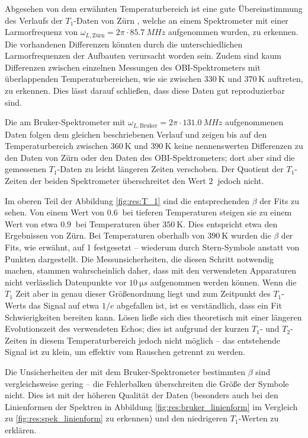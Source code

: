Abgesehen von dem erwähnten Temperaturbereich ist eine gute Übereinstimmung des Verlaufs der $T_1$-Daten von Zürn \cite{zuern_paper}, welche an einem Spektrometer mit einer Larmorfrequenz von $\omega_{L, \text{Zürn}} = 2\pi \cdot \SI{85.7}{MHz}$ aufgenommen wurden, zu erkennen. Die vorhandenen Differenzen könnten durch die unterschiedlichen Larmorfrequenzen der Aufbauten verursacht worden sein. Zudem sind kaum Differenzen zwischen einzelnen Messungen des OBI-Spektrometers mit überlappenden Temperaturbereichen, wie sie zwischen $\SI{330}{\kelvin}$ und $\SI{370}{\kelvin}$ auftreten, zu erkennen. Dies lässt darauf schließen, dass diese Daten gut reproduzierbar sind.

Die am Bruker-Spektrometer mit $\omega_{L, \text{Bruker}} = 2\pi \cdot \SI{131.0}{MHz}$ aufgenommenen Daten folgen dem gleichen beschriebenen Verlauf und zeigen bis auf den Temperaturbereich zwischen $\SI{360}{\kelvin}$ und $\SI{390}{\kelvin}$ keine nennenswerten Differenzen zu den Daten von Zürn oder den Daten des OBI-Spektrometers; dort aber sind die gemessenen $T_1$-Daten zu leicht längeren Zeiten verschoben. Der Quotient der $T_1$-Zeiten der beiden Spektrometer überschreitet den Wert $\SI{2}{}$ jedoch nicht.

Im oberen Teil der Abbildung \ref{fig:res:T_1} sind die entsprechenden $\beta$ der Fits zu sehen. Von einem Wert von $\SI{0.6}{}$ bei tieferen Temperaturen steigen sie zu einem Wert von etwa $\SI{0.9}{}$ bei Temperaturen über $\SI{350}{\kelvin}$. Dies entspricht etwa den Ergebnissen von Zürn. Bei Temperaturen oberhalb von $\SI{390}{\kelvin}$ wurden die $\beta$ der Fits, wie erwähnt, auf 1 festgesetzt -- wiederum durch Stern-Symbole anstatt von Punkten dargestellt. Die Messunsicherheiten, die diesen Schritt notwendig machen, stammen wahrscheinlich daher, dass mit den verwendeten Apparaturen nicht verlässlich Datenpunkte vor $\SI{10}{\micro s}$ aufgenommen werden können. Wenn die $T_1$ Zeit aber in genau dieser Größenordnung liegt und zum Zeitpunkt des $T_1$-Werts das Signal auf etwa $1/e$ abgefallen ist, ist es verständlich, dass ein Fit Schwierigkeiten bereiten kann. Lösen ließe sich dies theoretisch mit einer längeren Evolutionszeit des verwendeten Echos; dies ist aufgrund der kurzen $T_1$- und $T_2$-Zeiten in diesem Temperaturbereich jedoch nicht möglich -- das entstehende Signal ist zu klein, um effektiv vom Rauschen getrennt zu werden.

Die Unsicherheiten der mit dem Bruker-Spektrometer bestimmten $\beta$ sind vergleichsweise gering -- die Fehlerbalken überschreiten die Größe der Symbole nicht. Dies ist mit der höheren Qualität der Daten (besonders auch bei den Linienformen der Spektren in Abbildung \ref{fig:res:bruker_linienform} im Vergleich zu \ref{fig:res:spek_linienform} zu erkennen) und den niedrigeren $T_1$-Werten zu erklären.




